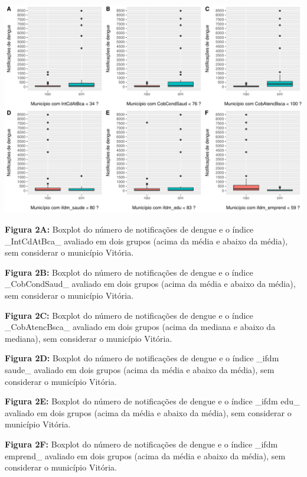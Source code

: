 \documentclass[12pt,a4paper]{article}\usepackage[]{graphicx}\usepackage[]{color}
\makeatletter
\def\maxwidth{ %
  \ifdim\Gin@nat@width>\linewidth
    \linewidth
  \else
    \Gin@nat@width
  \fi
}
\newenvironment{knitrout}{}{} %
\makeatother
\begin{document}
\begin{knitrout}
\color{fgcolor}

{\centering \includegraphics[width=\maxwidth]{figure/unnamed-chunk-4-1} 

}



\end{knitrout}
\textbf{Figura 2A:} Boxplot do número de notificações de dengue e o índice \_IntCdAtBca\_ avaliado em dois grupos (acima da média e abaixo da média), sem considerar o município Vitória.  

\textbf{Figura 2B:} Boxplot do número de notificações de dengue e o índice \_CobCondSaud\_ avaliado em dois grupos (acima da média e abaixo da média), sem considerar o município Vitória.

\textbf{Figura 2C:} Boxplot do número de notificações de dengue e o índice \_CobAtencBsca\_ avaliado em dois grupos (acima da mediana e abaixo da mediana), sem considerar o município Vitória.

\textbf{Figura 2D:} Boxplot do número de notificações de dengue e o índice \_ifdm saude\_ avaliado em dois grupos (acima da média e abaixo da média), sem considerar o município Vitória.

\textbf{Figura 2E:} Boxplot do número de notificações de dengue e o índice \_ifdm edu\_ avaliado em dois grupos (acima da média e abaixo da média), sem considerar o município Vitória.

\textbf{Figura 2F:} Boxplot do número de notificações de dengue e o índice \_ifdm emprend\_ avaliado em dois grupos (acima da média e abaixo da média), sem considerar o município Vitória.
\end{document}
